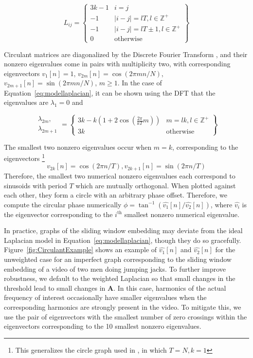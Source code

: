 \documentclass{article}
\newcommand{\mb}{\mathbf}
\begin{document}
\begin{equation}
\label{eq:modellaplacian}
L_{ij} = \left\{ \begin{array}{cc} 3k-1 & i = j \\ -1 & |i-j| = lT, l \in \mathbb{Z}^+ \\ -1 & |i-j| = lT \pm 1, l \in \mathbb{Z}^+ \\ 0 & \text{otherwise} \end{array} \right\}
\end{equation}

Circulant matrices are diagonalized by the Discrete Fourier Transform \cite{godsil2013algebraic}, and their nonzero eigenvalues come in pairs with multiplicity two, with corresponding eigenvectors $v_1[n] = 1$, $v_{2m}[n] = \cos(2 \pi mn / N)$, $v_{2m+1}[n] = \sin(2 \pi m n / N)$, $m \geq 1$.  In the case of Equation~\ref{eq:modellaplacian}, it can be shown using the DFT that the eigenvalues are $\lambda_1 = 0$ and 

\begin{equation}
\begin{array}{cc}\lambda_{2m},\\\lambda_{2m+1}\end{array} = \left\{ \begin{array}{cc} 3k - k\left( 1 + 2 \cos \left( \frac{2 \pi}{kT} m \right) \right) & m = lk, l \in \mathbb{Z}^+ \\ 3k & \text{otherwise}  \end{array} \right\} 
\end{equation}

The smallest two nonzero eigenvalues occur when $m = k$, corresponding to the eigenvectors \footnote{This generalizes the circle graph used in \cite{averbuch2015ringit}, in which $T = N, k = 1$} 
\begin{equation}
v_{2k}[n] = \cos(2 \pi n / T), v_{2k+1}[n] = \sin(2 \pi n / T)
\end{equation}
Therefore, the smallest two numerical nonzero eigenvalues each correspond to sinusoids with period $T$ which are mutually orthogonal.  When plotted against each other, they form a circle with an arbitrary phase offset.  Therefore, we compute the circular phase numerically $\phi = \tan^{-1}(\hat{v_1}[n] / \hat{v_2}[n])$, where $\hat{v_i}$ is the eigenvector corresponding to the $i^\text{th}$ smallest nonzero numerical eigenvalue.

In practice, graphs of the sliding window embedding may deviate from the ideal Laplacian model in Equation~\ref{eq:modellaplacian}, though they do so gracefully.  Figure~\ref{fig:CirculantExample} shows an example of $\hat{v_1}[n]$ and $\hat{v_2}[n]$ for the unweighted case for an imperfect graph corresponding to the sliding window embedding of a video of two men doing jumping jacks.  To further improve robustness, we default to the weighted Laplacian so that small changes in the threshold lead to small changes in $\mb{A}$.  In this case, harmonics of the actual frequency of interest occasionally have smaller eigenvalues when the corresponding harmonics are strongly present in the video.  To mitigate this, we use the pair of eigenvectors with the smallest number of zero crossings within the eigenvectors corresponding to the 10 smallest nonzero eigenvalues.
\end{document}
